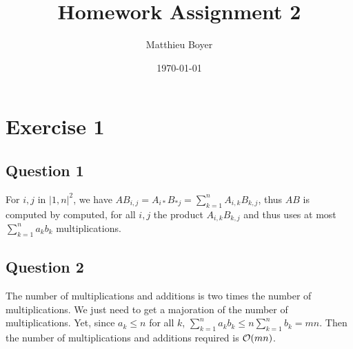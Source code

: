 \documentclass{cours}
\date{\today}
\author{Matthieu Boyer}
\title{Homework Assignment 2}
\begin{document}
    \section{Exercise 1}
        \subsection{Question 1}
            For $i, j$ in $\lvert 1, n \rvert^{2}$, we have $AB_{i, j} = A_{i*}B_{*j} = \sum_{k = 1}^{n} A_{i, k}B_{k, j}$, thus $AB$ is computed by computed, for all $i, j$ the product $A_{i,k}B_{k,j}$ and thus uses at most $\sum_{k = 1}^{n} a_{k}b_{k}$ multiplications.

        \subsection{Question 2}
            The number of multiplications and additions is two times the number of multiplications. We just need to get a majoration of the number of multiplications. Yet, since $a_{k} \leq n$ for all $k$, $\sum_{k = 1}^{n} a_{k} b_{k} \leq n \sum_{k=1}^{n}b_{k} = mn$. Then the number of multiplications and additions required is $\mathcal{O}(mn)$.
\end{document}
